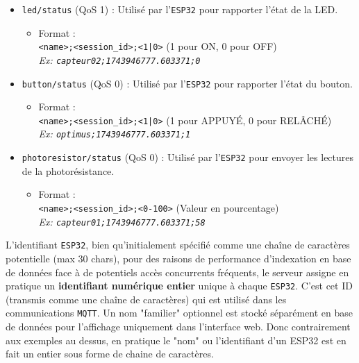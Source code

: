 \documentclass[12pt]{article}
\begin{document}
\begin{itemize}
    \item \texttt{led/status} (QoS 1) : Utilisé par l'\texttt{ESP32} pour rapporter l'état de la LED.
    \begin{itemize}
        \item Format : \\
        \texttt{<name>;<session\_id>;<1|0>} (1 pour ON, 0 pour OFF) \\
        \textit{Ex: \texttt{capteur02;1743946777.603371;0}}
    \end{itemize}

    \item \texttt{button/status} (QoS 0) : Utilisé par l'\texttt{ESP32} pour rapporter l'état du bouton.
    \begin{itemize}
        \item Format : \\
        \texttt{<name>;<session\_id>;<1|0>} (1 pour APPUYÉ, 0 pour RELÂCHÉ) \\
        \textit{Ex: \texttt{optimus;1743946777.603371;1}}
    \end{itemize}

    \item \texttt{photoresistor/status} (QoS 0) : Utilisé par l'\texttt{ESP32} pour envoyer les lectures de la photorésistance.
    \begin{itemize}
        \item Format : \\
        \texttt{<name>;<session\_id>;<0-100>} (Valeur en pourcentage) \\
        \textit{Ex: \texttt{capteur01;1743946777.603371;58}}
    \end{itemize}
\end{itemize} \hfill \break

L'identifiant \texttt{ESP32}, bien qu'initialement spécifié comme une chaîne de caractères potentielle (max 30 chars), pour des raisons de performance d'indexation en base de données face à de potentiels accès concurrents fréquents, le serveur assigne en pratique un \textbf{identifiant numérique entier} unique à chaque \texttt{ESP32}. C'est cet ID (transmis comme une chaîne de caractères) qui est utilisé dans les communications \texttt{MQTT}. Un nom "familier" optionnel est stocké séparément en base de données pour l'affichage uniquement dans l'interface web. Donc contrairement aux exemples au dessus, en pratique le "nom" ou l'identifiant d'un ESP32 est en fait un entier sous forme de chaine de caractères. \\
\end{document}
